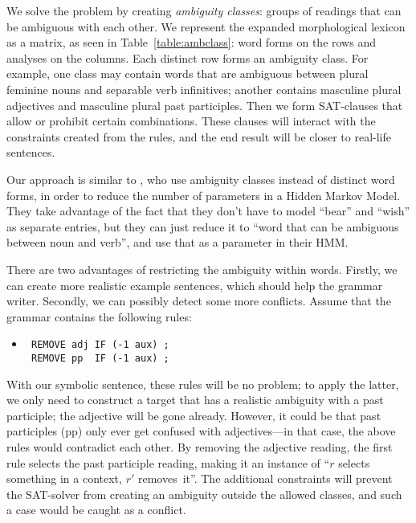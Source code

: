{{We solve the problem by creating \emph{ambiguity classes}: groups of
readings that can be ambiguous with each other.  We represent the
expanded morphological lexicon as a matrix, as seen in
Table~\ref{table:ambclass}: word forms on the rows and analyses on the
columns. Each distinct row forms an ambiguity class. For example, one
class may contain words that are ambiguous between plural feminine
nouns and separable verb infinitives; another contains masculine
plural adjectives and masculine plural past participles.  Then we form
SAT-clauses that allow or prohibit certain combinations. These clauses
will interact with the constraints created from the rules, and the end
result will be closer to real-life sentences.

Our approach is similar to , who use ambiguity
classes instead of distinct word forms, in order to reduce the number
of parameters in a Hidden Markov Model. They take advantage of the
fact that they don't have to model ``bear'' and ``wish'' as separate
entries, but they can just reduce it to ``word that can be ambiguous
between noun and verb'', and use that as a parameter in their HMM.

There are two advantages of restricting the ambiguity within words.
Firstly, we can create more realistic example sentences, which should help the grammar writer.
Secondly, we can possibly detect some more conflicts. Assume that the grammar contains the following rules:

 \begin{itemize}
 \item[] 
\begin{verbatim}
 REMOVE adj IF (-1 aux) ;
 REMOVE pp  IF (-1 aux) ;
 \end{verbatim}
 \end{itemize}

 With our symbolic sentence, these rules will be no problem; to apply the latter, we only need to construct a target that has a realistic ambiguity with a past participle; the adjective will be gone already.
However, it could be that past participles (pp) only ever get confused with adjectives---in that case, the above rules would contradict each other.
 By removing the adjective reading, the first rule selects the past participle reading, making it an instance of ``$r$ selects something in a context, $r'$ removes~it''. 
The additional constraints will prevent the SAT-solver from creating an ambiguity outside the allowed classes, and such a case would be caught as a conflict.

}}
